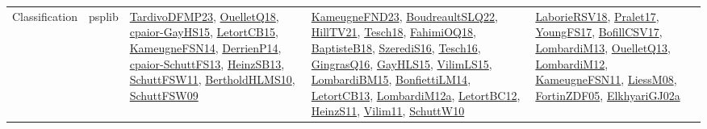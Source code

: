 {\begin{longtable}{lp{3cm}>{\raggedright}p{6cm}>{\raggedright}p{6cm}p{8cm}}
Classification & psplib & \href{papers/TardivoDFMP23.pdf}{TardivoDFMP23}\cite{TardivoDFMP23}, \href{papers/OuelletQ18.pdf}{OuelletQ18}\cite{OuelletQ18}, \href{papers/cpaior-GayHS15.pdf}{cpaior-GayHS15}\cite{cpaior-GayHS15}, \href{articles/LetortCB15.pdf}{LetortCB15}\cite{LetortCB15}, \href{articles/KameugneFSN14.pdf}{KameugneFSN14}\cite{KameugneFSN14}, \href{papers/DerrienP14.pdf}{DerrienP14}\cite{DerrienP14}, \href{papers/cpaior-SchuttFS13.pdf}{cpaior-SchuttFS13}\cite{cpaior-SchuttFS13}, \href{articles/HeinzSB13.pdf}{HeinzSB13}\cite{HeinzSB13}, \href{articles/SchuttFSW11.pdf}{SchuttFSW11}\cite{SchuttFSW11}, \href{papers/BertholdHLMS10.pdf}{BertholdHLMS10}\cite{BertholdHLMS10}, \href{papers/SchuttFSW09.pdf}{SchuttFSW09}\cite{SchuttFSW09} & \href{papers/KameugneFND23.pdf}{KameugneFND23}\cite{KameugneFND23}, \href{papers/BoudreaultSLQ22.pdf}{BoudreaultSLQ22}\cite{BoudreaultSLQ22}, \href{papers/HillTV21.pdf}{HillTV21}\cite{HillTV21}, \href{papers/Tesch18.pdf}{Tesch18}\cite{Tesch18}, \href{articles/FahimiOQ18.pdf}{FahimiOQ18}\cite{FahimiOQ18}, \href{articles/BaptisteB18.pdf}{BaptisteB18}\cite{BaptisteB18}, \href{papers/SzerediS16.pdf}{SzerediS16}\cite{SzerediS16}, \href{papers/Tesch16.pdf}{Tesch16}\cite{Tesch16}, \href{papers/GingrasQ16.pdf}{GingrasQ16}\cite{GingrasQ16}, \href{papers/GayHLS15.pdf}{GayHLS15}\cite{GayHLS15}, \href{papers/VilimLS15.pdf}{VilimLS15}\cite{VilimLS15}, \href{papers/LombardiBM15.pdf}{LombardiBM15}\cite{LombardiBM15}, \href{papers/BonfiettiLM14.pdf}{BonfiettiLM14}\cite{BonfiettiLM14}, \href{papers/LetortCB13.pdf}{LetortCB13}\cite{LetortCB13}, \href{articles/LombardiM12a.pdf}{LombardiM12a}\cite{LombardiM12a}, \href{papers/LetortBC12.pdf}{LetortBC12}\cite{LetortBC12}, \href{papers/HeinzS11.pdf}{HeinzS11}\cite{HeinzS11}, \href{papers/Vilim11.pdf}{Vilim11}\cite{Vilim11}, \href{papers/SchuttW10.pdf}{SchuttW10}\cite{SchuttW10} & \href{articles/LaborieRSV18.pdf}{LaborieRSV18}\cite{LaborieRSV18}, \href{papers/Pralet17.pdf}{Pralet17}\cite{Pralet17}, \href{papers/YoungFS17.pdf}{YoungFS17}\cite{YoungFS17}, \href{papers/BofillCSV17.pdf}{BofillCSV17}\cite{BofillCSV17}, \href{papers/LombardiM13.pdf}{LombardiM13}\cite{LombardiM13}, \href{papers/OuelletQ13.pdf}{OuelletQ13}\cite{OuelletQ13}, \href{articles/LombardiM12.pdf}{LombardiM12}\cite{LombardiM12}, \href{papers/KameugneFSN11.pdf}{KameugneFSN11}\cite{KameugneFSN11}, \href{articles/LiessM08.pdf}{LiessM08}\cite{LiessM08}, \href{papers/FortinZDF05.pdf}{FortinZDF05}\cite{FortinZDF05}, \href{papers/ElkhyariGJ02a.pdf}{ElkhyariGJ02a}\cite{ElkhyariGJ02a}\\

\end{longtable}}
